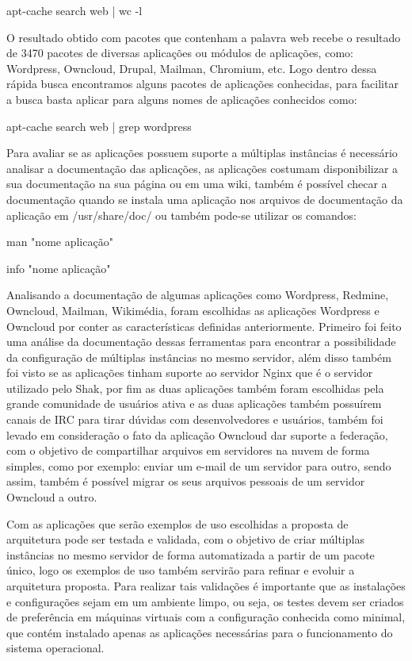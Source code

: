 \begin{center}
apt-cache search web | wc -l
\end{center}

O resultado obtido com pacotes que contenham a palavra web recebe o resultado de 3470
pacotes de diversas aplicações ou módulos de aplicações, como:
Wordpress, Owncloud, Drupal, Mailman, Chromium, etc. Logo dentro dessa rápida busca
encontramos alguns pacotes de aplicações conhecidas, para facilitar a busca basta
aplicar para alguns nomes de aplicações conhecidos como:

\begin{center}
apt-cache search web | grep wordpress
\end{center}

Para avaliar se as aplicações possuem suporte a múltiplas instâncias é necessário
analisar a documentação das aplicações, as aplicações costumam disponibilizar a sua
documentação na sua página ou em uma wiki, também é possível checar a documentação
quando se instala uma aplicação nos arquivos de documentação da aplicação em
/usr/share/doc/ ou também pode-se utilizar os comandos:

\begin{center}
man "nome aplicação"

info "nome aplicação"
\end{center}

Analisando a documentação de algumas aplicações como Wordpress, Redmine,
Owncloud, Mailman, Wikimédia, foram escolhidas as aplicações Wordpress e Owncloud por
conter as características definidas anteriormente. Primeiro
foi feito uma análise da documentação dessas ferramentas para encontrar a
possibilidade da configuração de múltiplas instâncias no mesmo servidor, além
disso também foi visto se as aplicações tinham suporte ao servidor Nginx que é
o servidor utilizado pelo Shak, por fim as duas aplicações também foram escolhidas
pela grande comunidade de usuários ativa e as duas aplicações também possuírem
canais de IRC para tirar dúvidas com desenvolvedores e usuários, também foi levado
em consideração o fato da  aplicação Owncloud dar suporte a federação,
com  o objetivo de compartilhar arquivos em servidores na nuvem de forma simples,
como por exemplo: enviar um e-mail de um servidor para outro, sendo assim,
também é possível migrar os seus arquivos pessoais de um servidor Owncloud a outro.

Com as aplicações que serão exemplos de uso escolhidas a proposta de arquitetura
pode ser testada e validada, com o objetivo de criar múltiplas instâncias
no mesmo servidor de forma automatizada a partir de um pacote único, logo os
exemplos de uso também servirão para refinar e evoluir a arquitetura proposta.
Para realizar tais validações é importante que as instalações e configurações
sejam em um ambiente limpo, ou seja, os testes devem ser criados de preferência
em máquinas virtuais com a configuração conhecida como minimal, que contém
instalado apenas as aplicações necessárias para o funcionamento do sistema operacional.

